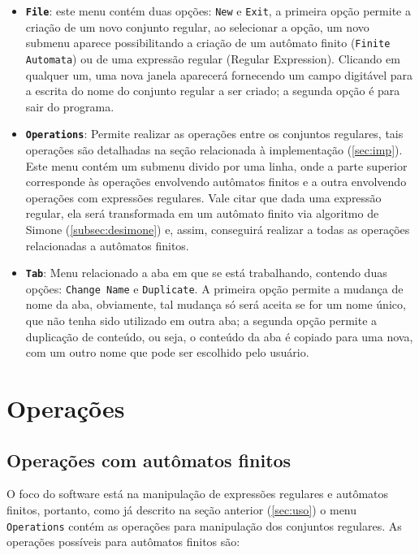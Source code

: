 \documentclass{article}
\begin{document}
    \begin{itemize}
        \item \texttt{\textbf{File}}: este menu contém duas opções:
            \texttt{New} e \texttt{Exit}, a primeira opção permite a criação de
            um novo conjunto regular, ao selecionar a opção, um novo submenu
            aparece possibilitando a criação de um autômato finito
            (\texttt{Finite Automata}) ou de uma expressão regular (Regular
            Expression). Clicando em qualquer um, uma nova janela aparecerá
            fornecendo um campo digitável para a escrita do nome do conjunto
            regular a ser criado; a segunda opção é para sair do programa.

        \item \texttt{\textbf{Operations}}: Permite realizar as operações entre
            os conjuntos regulares, tais operações são detalhadas na seção
            relacionada à implementação (\ref{sec:imp}). Este menu contém um
            submenu divido por uma linha, onde a parte superior corresponde às
            operações envolvendo autômatos finitos e a outra envolvendo
            operações com expressões regulares. Vale citar que dada uma
            expressão regular, ela será transformada em um autômato finito via
            algoritmo de Simone (\ref{subsec:desimone}) e, assim, conseguirá
            realizar a todas as operações relacionadas a autômatos finitos.
 
        \item \texttt{\textbf{Tab}}: Menu relacionado a aba em que se está
            trabalhando, contendo duas opções: \texttt{Change Name} e
            \texttt{Duplicate}. A primeira opção permite a mudança de nome da
            aba, obviamente, tal mudança só será aceita se for um nome único,
            que não tenha sido utilizado em outra aba; a segunda opção permite
            a duplicação de conteúdo, ou seja, o conteúdo da aba é copiado para
            uma nova, com um outro nome que pode ser escolhido pelo usuário.
    \end{itemize}
 
\section{Operações}
    \subsection{Operações com autômatos finitos}
        O foco do software está na manipulação de expressões regulares e
        autômatos finitos, portanto, como já descrito na seção anterior
        (\ref{sec:uso}) o menu \texttt{Operations} contém as operações para
        manipulação dos conjuntos regulares. As operações possíveis para
        autômatos finitos são:
\end{document}
